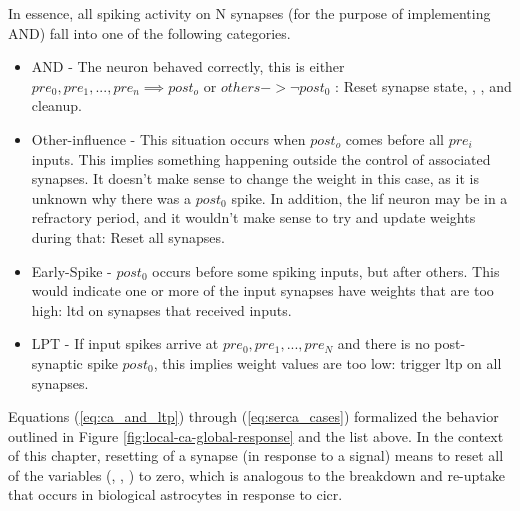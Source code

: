 


In essence, all spiking activity on N synapses (for the purpose of implementing
AND) fall into one of the following categories.
\begin{itemize}
\item AND - The neuron behaved correctly, this is either $pre_0, pre_1, ...,
  pre_n \implies post_o$ or $others -> \neg post_0$ : Reset synapse state, \ipt,
  \kp, and \ca cleanup.
\item Other-influence - This situation occurs when $post_o$ comes before all
  $pre_i$ inputs. This implies something happening outside the control of
  associated synapses. It doesn't make sense to change the weight in this case,
  as it is unknown why there was a $post_0$ spike. In addition, the \gls{lif} neuron
  may be in a refractory period, and it wouldn't make sense to try and update
  weights during that: Reset all synapses.
\item Early-Spike - $post_0$ occurs before some spiking inputs, but after
  others. This would indicate one or more of the input synapses have weights
  that are too high: \gls{ltd} on synapses that received inputs.
\item LPT - If input spikes arrive at $pre_0, pre_1, ..., pre_N$ and there is no
  post-synaptic spike $post_0$, this implies weight values are too low: trigger
  \gls{ltp} on all synapses.
\end{itemize}

Equations (\ref{eq:ca_and_ltp}) through (\ref{eq:serca_cases}) formalized the behavior outlined
in Figure \ref{fig:local-ca-global-response} and the list above. In the context
of this chapter, resetting of a synapse (in response to a \serca signal) means
to reset all of the variables (\ca, \ipt, \kp) to zero, which is analogous to
the breakdown and re-uptake that occurs in biological astrocytes in response to
\gls{cicr}.

